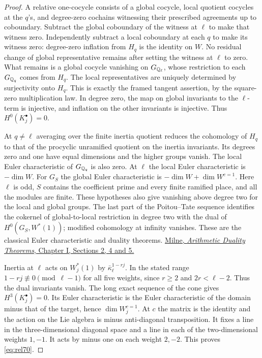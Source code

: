 \documentclass[a4paper,11pt]{article}
\theoremstyle{definition}
\theoremstyle{remark}
\numberwithin{equation}{section}
\begin{document}
\begin{proof}
A relative one-cocycle consists of a global cocycle, local
quotient cocycles at the \(q\)'s, and degree-zero cochains
witnessing their prescribed agreements up to coboundary.
Subtract the global coboundary of the witness at \(\ell\)
to make that witness zero. Independently subtract a local
coboundary at each \(q\) to make its witness zero: degree-zero
inflation from \(H_q\) is the identity on \(W\). No residual
change of global representative remains after setting the witness
at \(\ell\) to zero. What remains is a global cocycle vanishing
on \(G_{\mathbb Q_\ell}\), whose restriction to each \(G_{\mathbb Q_q}\)
comes from \(H_q\). The local representatives are uniquely
determined by surjectivity onto \(H_q\). This is exactly the
framed tangent assertion, by the square-zero multiplication law.
In degree zero, the map on global invariants to the \(\ell\)-term
is injective, and inflation on the other invariants is injective.
Thus \(H^0(K_j^\bullet)=0\).

At \(q\ne\ell\) averaging over the finite inertia quotient
reduces the cohomology of \(H_q\) to that of the procyclic
unramified quotient on the inertia invariants. Its degrees zero
and one have equal dimensions and the higher groups vanish.
The local Euler characteristic of \(G_{\mathbb Q_q}\) is also zero.
At \(\ell\) the local Euler characteristic is \(-\dim W\).
For \(G_S\) the global Euler characteristic is
\(-\dim W+\dim W^{c=1}\). Here \(\ell\) is odd,
\(S\) contains the coefficient prime and every finite ramified
place, and all the modules are finite. These hypotheses also
give vanishing above degree two for the local and global
groups. The last part of the Poitou--Tate sequence identifies
the cokernel of global-to-local restriction in degree two with
the dual of \(H^0(G_S,W^*(1))\); modified cohomology at infinity
vanishes. These are the classical Euler characteristic and
duality theorems. \href{https://www.jmilne.org/math/Books/ADTnot.pdf}{Milne,
\emph{Arithmetic Duality Theorems}, Chapter I, Sections 2, 4 and 5.}

Inertia at \(\ell\) acts on \(W_j^*(1)\) by
\(\bar\kappa_\ell^{1-rj}\). In the stated range
\(1-rj\not\equiv0\pmod{\ell-1}\) for all five weights, since
\(r\ge2\) and \(2r<\ell-2\). Thus the dual invariants vanish.
The long exact sequence of the cone gives \(H^3(K_j^\bullet)=0\).
Its Euler characteristic is the Euler characteristic of the
domain minus that of the target, hence \(\dim W_j^{c=1}\).
At \(c\) the matrix is the identity and the action on the Lie
algebra is minus anti-diagonal transposition. It fixes a line
in the three-dimensional diagonal space and a line in each
of the two-dimensional weights \(1,-1\). It acts by minus
one on each weight \(2,-2\). This proves \eqref{eq:rel70}.
\end{proof}
\end{document}
